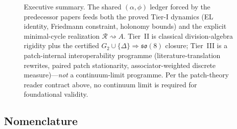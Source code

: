 \documentclass[11pt]{amsart}
\begin{document}
\begin{figure}[ht]
\caption{Executive summary. The shared \((\alpha,\phi)\) ledger forced by the predecessor papers feeds both the proved Tier-I dynamics (EL identity, Friedmann constraint, holonomy bounds) and the explicit minimal-cycle realization \(\mathcal{R}\rightsquigarrow A\). Tier~II is classical division-algebra rigidity plus the certified \(G_2\cup\{\Delta\}\Rightarrow\mathfrak{so}(8)\) closure; Tier~III is a patch-internal interoperability programme (literature-translation rewrites, paired patch stationarity, associator-weighted discrete measure)---\emph{not} a continuum-limit programme. Per the patch-theory reader contract above, no continuum limit is required for foundational validity.}
\label{fig:exec-summary}
\end{figure}

\subsection{Nomenclature}
\label{subsec:nomenclature}
\end{document}
